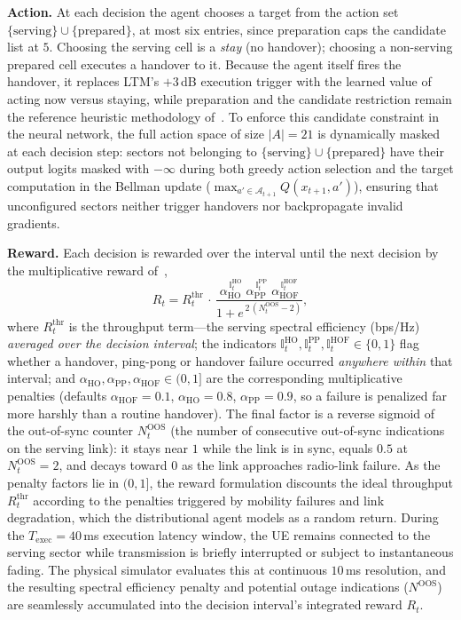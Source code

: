 \documentclass{ieeetmlcn}
\begin{document}
\textbf{Action.} At each decision the agent chooses a target from the action set
$\{\text{serving}\}\cup\{\text{prepared}\}$, at most six entries, since
preparation caps the candidate list at $5$. Choosing the serving cell is a
\emph{stay} (no handover); choosing a non-serving prepared cell executes a
handover to it. Because the agent itself fires the handover, it replaces LTM's
$+3$\,dB execution trigger with the learned value of acting now versus staying,
while preparation and the candidate restriction remain the reference heuristic methodology of~\cite{eric2024}. To enforce this candidate constraint in the neural network, the full action space of size $|A| = 21$ is dynamically masked at each decision step: sectors not belonging to $\{\text{serving}\} \cup \{\text{prepared}\}$ have their output logits masked with $-\infty$ during both greedy action selection and the target computation in the Bellman update ($\max_{a' \in \mathcal{A}_{t+1}} Q(x_{t+1}, a')$), ensuring that unconfigured sectors neither trigger handovers nor backpropagate invalid gradients.

\textbf{Reward.} Each decision is rewarded over the interval until the next
decision by the multiplicative reward of~\cite{cmab_ho},
\begin{equation}
R_t = R^{\mathrm{thr}}_t \,\cdot\,
      \frac{\alpha_{\mathrm{HO}}^{\,\mathbb{I}^{\mathrm{HO}}_t}\;
            \alpha_{\mathrm{PP}}^{\,\mathbb{I}^{\mathrm{PP}}_t}\;
            \alpha_{\mathrm{HOF}}^{\,\mathbb{I}^{\mathrm{HOF}}_t}}
           {1 + e^{\,2\,(N^{\mathrm{OOS}}_t - 2)}},
\label{eq:reward}
\end{equation}
where $R^{\mathrm{thr}}_t$ is the throughput term---the serving spectral
efficiency (bps/Hz) \emph{averaged over the decision interval}; the indicators
$\mathbb{I}^{\mathrm{HO}}_t,\mathbb{I}^{\mathrm{PP}}_t,\mathbb{I}^{\mathrm{HOF}}_t\in\{0,1\}$
flag whether a handover, ping-pong or handover failure occurred \emph{anywhere
within} that interval; and
$\alpha_{\mathrm{HO}},\alpha_{\mathrm{PP}},\alpha_{\mathrm{HOF}}\in(0,1]$ are the
corresponding multiplicative penalties (defaults $\alpha_{\mathrm{HOF}}{=}0.1$,
$\alpha_{\mathrm{HO}}{=}0.8$, $\alpha_{\mathrm{PP}}{=}0.9$, so a failure is
penalized far more harshly than a routine handover). The final factor is a
reverse sigmoid of the out-of-sync counter $N^{\mathrm{OOS}}_t$ (the number of
consecutive out-of-sync indications on the serving link): it stays near $1$
while the link is in sync, equals $0.5$ at $N^{\mathrm{OOS}}_t{=}2$, and decays
toward $0$ as the link approaches radio-link failure.
As the penalty factors lie in $(0,1]$, the reward formulation discounts the ideal throughput $R^{\mathrm{thr}}_t$ according to the penalties triggered by mobility failures and link degradation, which the distributional agent models as a random
return. During the $T_{\text{exec}} = 40$\,ms execution latency window, the UE remains connected to the serving sector while transmission is briefly interrupted or subject to instantaneous fading. The physical simulator evaluates this at continuous $10$\,ms resolution, and the resulting spectral efficiency penalty and potential outage indications ($N^{\text{OOS}}$) are seamlessly accumulated into the decision interval's integrated reward $R_t$.
\end{document}
